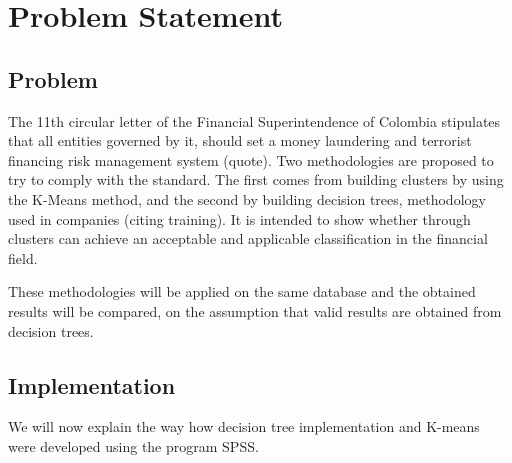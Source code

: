 \chapter{Problem Statement}
\label{chap:planteamientoproblema}

\section{Problem}
The 11th circular letter of the Financial Superintendence of Colombia stipulates that all entities governed by it, should set a money laundering and terrorist financing risk management system (quote). Two methodologies are proposed to try to comply with the standard.
The first comes from building clusters by using the K-Means method, and the second by building decision trees, methodology used in companies (citing training). It is intended to show whether through clusters can achieve an acceptable and applicable classification in the financial field.\par
These methodologies will be applied on the same database and the obtained results will be compared, on the assumption that valid results are obtained from decision trees.
\section{Implementation}
We will now explain the way how decision tree implementation and K-means were developed using the program SPSS.
